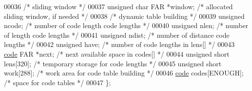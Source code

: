 \begin{DoxyCode}
00036         \textcolor{comment}{/* sliding window */}
00037     \textcolor{keywordtype}{unsigned} \textcolor{keywordtype}{char} FAR *window;  \textcolor{comment}{/* allocated sliding window, if needed */}
00038         \textcolor{comment}{/* dynamic table building */}
00039     \textcolor{keywordtype}{unsigned} ncode;             \textcolor{comment}{/* number of code length code lengths */}
00040     \textcolor{keywordtype}{unsigned} nlen;              \textcolor{comment}{/* number of length code lengths */}
00041     \textcolor{keywordtype}{unsigned} ndist;             \textcolor{comment}{/* number of distance code lengths */}
00042     \textcolor{keywordtype}{unsigned} have;              \textcolor{comment}{/* number of code lengths in lens[] */}
00043     \hyperlink{structcode}{code} FAR *next;             \textcolor{comment}{/* next available space in codes[] */}
00044     \textcolor{keywordtype}{unsigned} \textcolor{keywordtype}{short} lens[320];   \textcolor{comment}{/* temporary storage for code lengths */}
00045     \textcolor{keywordtype}{unsigned} \textcolor{keywordtype}{short} work[288];   \textcolor{comment}{/* work area for code table building */}
00046     \hyperlink{structcode}{code} codes[ENOUGH];         \textcolor{comment}{/* space for code tables */}
00047 \};
\end{DoxyCode}
